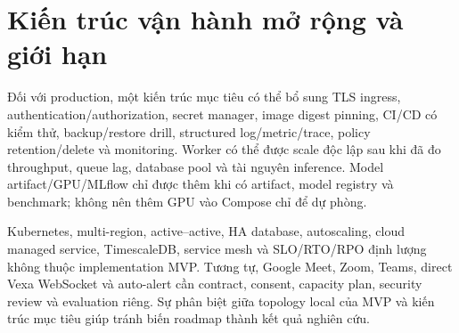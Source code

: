 \section{Kiến trúc vận hành mở rộng và giới hạn}
Đối với production, một kiến trúc mục tiêu có thể bổ sung TLS ingress, authentication/authorization, secret manager, image digest pinning, CI/CD có kiểm thử, backup/restore drill, structured log/metric/trace, policy retention/delete và monitoring. Worker có thể được scale độc lập sau khi đã đo throughput, queue lag, database pool và tài nguyên inference. Model artifact/GPU/MLflow chỉ được thêm khi có artifact, model registry và benchmark; không nên thêm GPU vào Compose chỉ để dự phòng.

Kubernetes, multi-region, active--active, HA database, autoscaling, cloud managed service, TimescaleDB, service mesh và SLO/RTO/RPO định lượng không thuộc implementation MVP. Tương tự, Google Meet, Zoom, Teams, direct Vexa WebSocket và auto-alert cần contract, consent, capacity plan, security review và evaluation riêng. Sự phân biệt giữa topology local của MVP và kiến trúc mục tiêu giúp tránh biến roadmap thành kết quả nghiên cứu.
